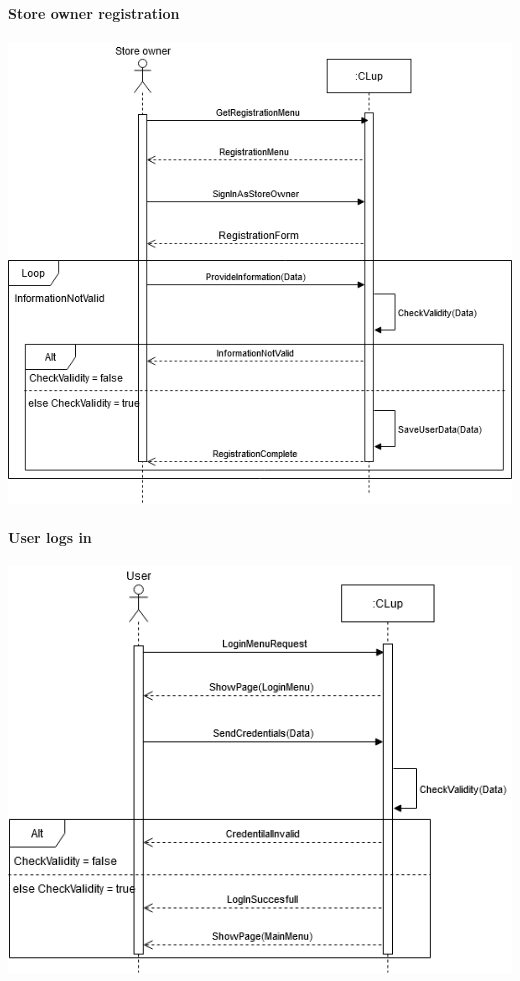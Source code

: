 \paragraph{Store owner registration}
\begin{flushleft}
	\includegraphics[scale=0.5]{Images/UseCase2Diagram.png}
\end{flushleft}
\newpage
\paragraph{User logs in}
\begin{flushleft}
	\includegraphics[scale=0.5]{Images/UseCase3Diagram.png}
\end{flushleft}
